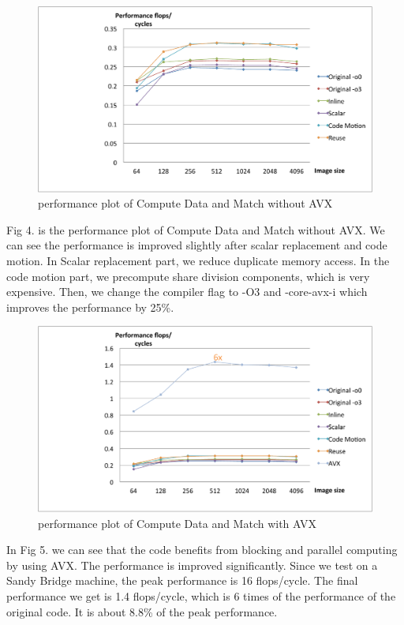 \documentclass[letterpaper]{article}
\begin{document}
\begin{figure}[H]\centering
  \includegraphics[scale=0.33]{compute_no_avx.pdf}
  \caption{performance plot of Compute Data and Match without AVX}
\end{figure}
Fig 4. is the performance plot of Compute Data and Match without AVX. We can see the performance is improved slightly after scalar replacement and code motion. In Scalar replacement part, we reduce duplicate memory access. In the code motion part, we precompute share division components, which is very expensive. Then, we change the compiler flag to -O3 and -core-avx-i which improves the performance by 25\%.
\begin{figure}[H]\centering
  \includegraphics[scale=0.33]{compute_with_avx.pdf}
  \caption{performance plot of Compute Data and Match with AVX}
\end{figure} 

In Fig 5. we can see that the code benefits from blocking and parallel computing by using AVX. The performance is improved significantly. Since we test on a Sandy Bridge machine, the peak performance is 16 flops/cycle. The final performance we get is 1.4 flops/cycle, which is 6 times of the performance of the original code. It is about 8.8\% of the peak performance.
\end{document}
